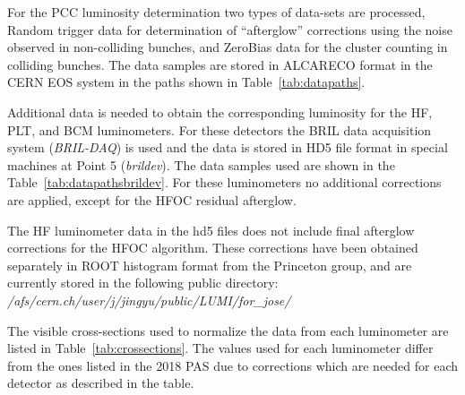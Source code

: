 
For the PCC luminosity determination two types of data-sets are processed, Random trigger data for determination of ``afterglow'' corrections using the noise observed in non-colliding bunches, and ZeroBias data for the cluster counting in colliding bunches.
The data samples are stored in ALCARECO format in the CERN EOS system in the paths shown in Table~\ref{tab:datapaths}.

Additional data is needed to obtain the corresponding luminosity for the HF, PLT, and BCM luminometers.
For these detectors the BRIL data acquisition system (\emph{BRIL-DAQ}) is used and the data is stored in HD5 file format in special machines at Point 5 (\emph{brildev}).
The data samples used are shown in the Table~\ref{tab:datapathsbrildev}.
For these luminometers no additional corrections are applied, except for the HFOC residual afterglow.

The HF luminometer data in the hd5 files does not include final afterglow corrections for the HFOC algorithm.
These corrections have been obtained separately in ROOT histogram format from the Princeton group, and are currently stored in the following public directory:\\
\emph{/afs/cern.ch/user/j/jingyu/public/LUMI/for\_jose/}

The visible cross-sections used to normalize the data from each luminometer are listed in Table~\ref{tab:crossections}.
The values used for each luminometer differ from the ones listed in the 2018 PAS due to corrections which are needed for each detector as described in the table.




